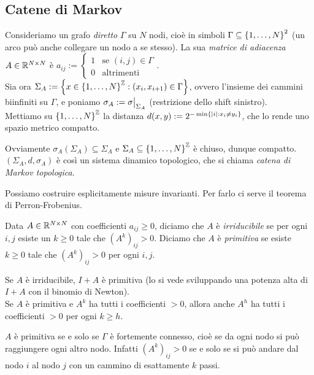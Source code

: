 \subsection{Catene di Markov}

Consideriamo un grafo \emph{diretto} $\Gamma$ su $N$ nodi, cioè in simboli $\Gamma\subseteq\left\{1,\dots,N\right\}^2$
(un arco può anche collegare un nodo a se stesso). La sua \emph{matrice di adiacenza} $A\in\mathbb{R}^{N\times N}$
è $a_{ij}:=\begin{cases}1 & \text{se }(i,j)\in\Gamma \\ 0 & \text{altrimenti}\end{cases}$. \\
Sia ora $\Sigma_A:=\left\{x\in\left\{1,\dots,N\right\}^{\mathbb{Z}}:(x_i,x_{i+1})\in\Gamma\right\}$, ovvero l'insieme dei cammini biinfiniti
su $\Gamma$, e poniamo $\sigma_A:=\restr{\sigma}{\Sigma_A}$ (restrizione dello shift sinistro). \\
Mettiamo su $\left\{1,\dots,N\right\}^{\mathbb{Z}}$ la distanza $d(x,y):=2^{-\min\left\{\left|i\right|:x_i\neq y_i\right\}}$, che lo rende
uno spazio metrico compatto.

\begin{oss}Ovviamente $\sigma_A(\Sigma_A)\subseteq \Sigma_A$ e $\Sigma_A\subseteq\left\{1,\dots,N\right\}^{\mathbb{Z}}$ è chiuso,
dunque compatto. $(\Sigma_A,d,\sigma_A)$ è così un sistema dinamico topologico, che si chiama \emph{catena di Markov topologica}.
\end{oss}

Possiamo costruire esplicitamente misure invarianti. Per farlo ci serve il teorema di Perron-Frobenius.

\begin{defi}Data $A\in\mathbb{R}^{N\times N}$ con coefficienti $a_{ij}\ge 0$, diciamo che $A$ è \emph{irriducibile}
se per ogni $i,j$ esiste un $k\ge 0$ tale che $(A^k)_{ij}>0$. Diciamo che $A$ è \emph{primitiva} se
esiste $k\ge 0$ tale che $(A^k)_{ij}>0$ per ogni $i,j$.
\end{defi}

\begin{oss}Se $A$ è irriducibile, $I+A$ è primitiva (lo si vede sviluppando una potenza alta di $I+A$ con il binomio di Newton). \\
Se $A$ è primitiva e $A^k$ ha tutti i coefficienti $>0$, allora anche $A^h$ ha tutti i coefficienti $>0$ per ogni $k\ge h$.
\end{oss}

\begin{oss}$A$ è primitiva se e solo se $\Gamma$ è fortemente connesso, cioè se da ogni nodo si può raggiungere ogni altro nodo.
Infatti $(A^k)_{ij}>0$ se e solo se si può andare dal nodo $i$ al nodo $j$ con un cammino di esattamente $k$ passi.
\end{oss}

